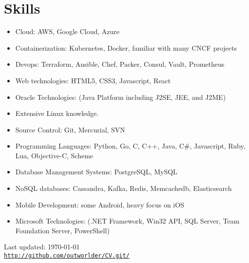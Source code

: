 \documentclass[letterpaper]{article}
\def\footerlink{http://github.com/outworlder/CV.git/}
\begin{document}
\section*{Skills}
\begin{itemize}
  \item Cloud: AWS, Google Cloud, Azure
  \item Containerization: Kubernetes, Docker, familiar with many CNCF projects
  \item Devops: Terraform, Ansible, Chef, Packer, Consul, Vault, Prometheus
  \item Web technologies: HTML5, CSS3, Javascript, React
  \item Oracle Technologies: (Java Platform including J2SE, JEE, and J2ME)
  \item Extensive Linux knowledge.
  \item Source Control: Git, Mercurial, SVN
  \item Programming Languages: Python, Go, C, C++, Java, C\#, Javascript, Ruby, Lua, Objective-C, Scheme
  \item Database Management Systems: PostgreSQL, MySQL
  \item NoSQL databases: Cassandra, Kafka, Redis, Memcachedb, Elasticsearch
  \item Mobile Development: some Android, heavy focus on iOS
  \item Microsoft Technologies: (.NET Framework, Win32 API, SQL Server, Team Foundation Server, PowerShell)
\end{itemize}


\begin{center}
  \begin{footnotesize}
    Last updated: \today \\
    \href{\footerlink}{\texttt{\footerlink}}
  \end{footnotesize}
\end{center}
\end{document}
